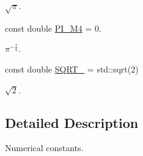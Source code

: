 \begin{DoxyCompactItemize}
\begin{DoxyCompactList}\small\item\em $ \sqrt{\pi} $. \end{DoxyCompactList}\item 
\hypertarget{namespaceconstants_a9b6eb4b81f3ef26474b7ec60ef4f7b40}{const double \hyperlink{namespaceconstants_a9b6eb4b81f3ef26474b7ec60ef4f7b40}{P\-I\-\_\-\-M4} = 0.}\label{namespaceconstants_a9b6eb4b81f3ef26474b7ec60ef4f7b40}

\begin{DoxyCompactList}\small\item\em $ \pi^{-\frac{1}{4}} $. \end{DoxyCompactList}\item 
\hypertarget{namespaceconstants_a61ee8d36601448a8e5a232be8852468e}{const double \hyperlink{namespaceconstants_a61ee8d36601448a8e5a232be8852468e}{S\-Q\-R\-T\-\_} = std\-::sqrt(2)}\label{namespaceconstants_a61ee8d36601448a8e5a232be8852468e}

\begin{DoxyCompactList}\small\item\em $ \sqrt{2} $. \end{DoxyCompactList}\end{DoxyCompactItemize}


\subsection{Detailed Description}
Numerical constants. 